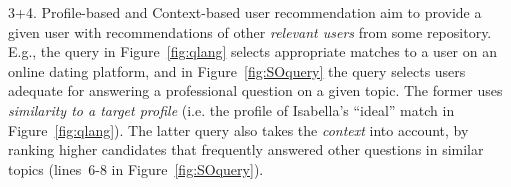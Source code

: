 \vspace{1px}  






\textsf{3+4. Profile-based} and \textsf{Context-based} user recommendation aim to provide a given user with recommendations of other \emph{relevant users} from some repository. %
E.g., the query in Figure~\ref{fig:qlang} selects appropriate matches to a user on an online dating platform, and in Figure~\ref{fig:SOquery} the query selects users adequate for answering a professional question on a given topic. The former uses \emph{similarity to a target profile} (i.e. the profile of Isabella's ``ideal'' match in Figure~\ref{fig:qlang}). The latter query also takes the \emph{context} into account, by ranking higher candidates that frequently answered other questions in similar topics (lines~6-8 in Figure~\ref{fig:SOquery}). 



